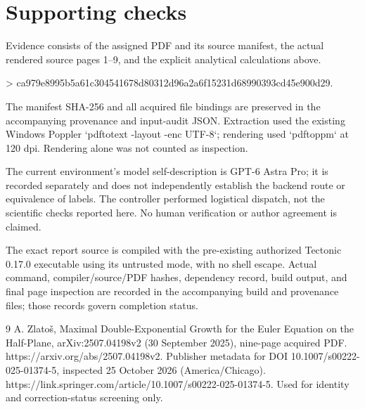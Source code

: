 \documentclass[10pt]{article}
\begin{document}
\section*{Supporting checks}
Evidence consists of the assigned PDF and its source manifest, the actual rendered source pages 1–9, and the explicit analytical calculations above.\par
> ca979e8995b5a61c304541678d80312d96a2a6f15231d68990393cd45e900d29.\par
The manifest SHA-256 and all acquired file bindings are preserved in the accompanying provenance and input-audit JSON. Extraction used the existing Windows Poppler `pdftotext -layout -enc UTF-8`; rendering used `pdftoppm` at 120 dpi. Rendering alone was not counted as inspection.\par
The current environment’s model self-description is GPT-6 Astra Pro; it is recorded separately and does not independently establish the backend route or equivalence of labels. The controller performed logistical dispatch, not the scientific checks reported here. No human verification or author agreement is claimed.\par
The exact report source is compiled with the pre-existing authorized Tectonic 0.17.0 executable using its untrusted mode, with no shell escape. Actual command, compiler/source/PDF hashes, dependency record, build output, and final page inspection are recorded in the accompanying build and provenance files; those records govern completion status.\par
9 A. Zlatoš, Maximal Double-Exponential Growth for the Euler Equation on the Half-Plane, arXiv:2507.04198v2 (30 September 2025), nine-page acquired PDF. https://arxiv.org/abs/2507.04198v2. Publisher metadata for DOI 10.1007/s00222-025-01374-5, inspected 25 October 2026 (America/Chicago). https://link.springer.com/article/10.1007/s00222-025-01374-5. Used for identity and correction-status screening only.\par
\end{document}

